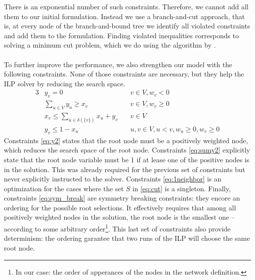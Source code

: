 		There is an exponential number of such constraints.
		Therefore, we cannot add all them to our initial formulation.
		Instead we use a branch-and-cut approach, that is, at every node of the branch-and-bound tree we identify all violated constraints and add them to the formulation.
		Finding violated inequalities corresponds to solving a minimum cut problem, which we do using the algorithm by \textcite{boykov2004experimental}.


		\paragraph{}
		To further improve the performance, we also strengthen our model with the following constraints. None of those constraints are necessary, but they help the ILP solver by reducing the search space.
		\begin{alignat}{3}
		\label{eq:y2}   & y_v = 0 & v \in V, w_v < 0\\
		\label{eq:sumy2} & \sum_{u \in V} y_u \geq x_v & v \in V, w_v\geq 0\\
		\label{eq:1neighbor} & x_v \leq \sum_{u \in \delta(\{v\})} x_u + y_v \quad & v \in V\\
		\label{eq:sym_break} & y_v \leq 1 - x_u \quad & u, v \in V, u < v, w_u \geq 0, w_v \geq 0
		\end{alignat}
		Constraints \eqref{eq:y2} states that the root node must be a positively weighted node, which reduces the search space of the root node.
		Constraints \eqref{eq:sumy2} explicitly state that the root node variable must be 1 if at lease one of the positive nodes is in the solution.
		This was already required for the previous set of constraints but never explicitly instructed to the solver.
		Constraints \eqref{eq:1neighbor} is an optimization for the cases where the set $S$ in \eqref{eq:cut} is a singleton.
		Finally, constraints \eqref{eq:sym_break} are symmetry breaking constraints: they encore an ordering for the possible root selections.
		It effectively requires that among all positively weighted nodes in the solution, the root node is the smallest one -- according to some arbitrary order\footnote{In our case: the order of apperances of the nodes in the network definition.}.
		This last set of constraints also provide determinism: the ordering garantee that two runs of the ILP will choose the same root node.

